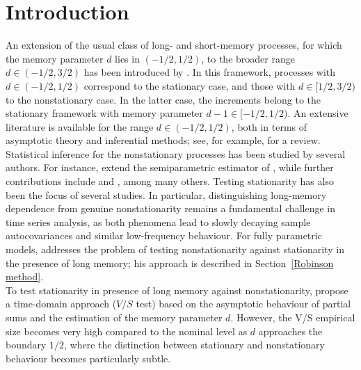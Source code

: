 \documentclass[12pt]{article}
\numberwithin{equation}{section}
\begin{document}
\section{Introduction}
An extension of the usual class of long- and short-memory processes, for which the memory parameter $d$ lies in $(-1/2, 1/2)$, to the broader range $d \in (-1/2, 3/2)$ has been introduced by \cite{Ray}. In this framework, processes with $d \in (-1/2, 1/2)$ correspond to the stationary case, and those with $d \in [1/2, 3/2)$ to the nonstationary case. In the latter case, the increments belong to the stationary framework with memory parameter $d-1 \in [-1/2, 1/2)$. An extensive literature is available for the range $d \in (-1/2, 1/2)$, both in terms of asymptotic theory and inferential methods; see, for example, \cite{MR2977317} for a review.
Statistical inference for the nonstationary processes has been studied by several authors. For instance, \cite{VELASCO1999325} extend the semiparametric estimator of \cite{Robinson1995}, while further contributions include \cite{Shao2010} and \cite{Abadir2007}, among many others.
Testing stationarity has also been the focus of several studies. In particular, distinguishing long-memory dependence from genuine nonstationarity remains a fundamental challenge in time series analysis, as both phenomena lead to slowly decaying sample autocovariances and similar low-frequency behaviour.
For fully parametric models, \cite{Robinson,Robinson2003} addresses the problem of testing nonstationarity against stationarity in the presence of long memory; his approach is described in Section~\ref{Robinson method}.\\
To test stationarity in presence of long memory against nonstationarity, \cite{MR2328526} propose a time-domain approach ($V/S$ test)  based on the asymptotic behaviour of partial sums and the estimation of the memory parameter $d$. However, the  V/S empirical size becomes very high compared to the nominal level as $d$ approaches the  boundary $1/2$, where the distinction between stationary and nonstationary behaviour becomes particularly subtle.
\end{document}
